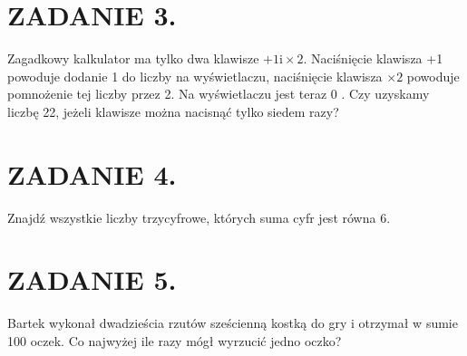 \documentclass[10pt]{article}
\begin{document}
\section*{ZADANIE 3.}
Zagadkowy kalkulator ma tylko dwa klawisze \(+1 \mathrm{i} \times 2\). Naciśnięcie klawisza +1 powoduje dodanie 1 do liczby na wyświetlaczu, naciśnięcie klawisza \(\times 2\) powoduje pomnożenie tej liczby przez 2. Na wyświetlaczu jest teraz 0 . Czy uzyskamy liczbę 22, jeżeli klawisze można nacisnąć tylko siedem razy?

\section*{ZADANIE 4.}
Znajdź wszystkie liczby trzycyfrowe, których suma cyfr jest równa 6.

\section*{ZADANIE 5.}
Bartek wykonał dwadzieścia rzutów sześcienną kostką do gry i otrzymał w sumie 100 oczek. Co najwyżej ile razy mógł wyrzucić jedno oczko?
\end{document}
